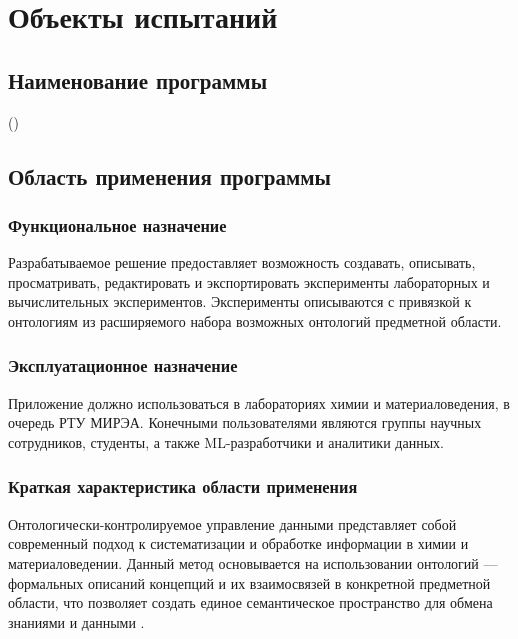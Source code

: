 \documentclass[a4paper,12pt,reqno]{article}
\begin{document}
    \project{\unskip}

    \firstPage
    \newpage
    \secondPage
    \newpage
    \thirdPage
    \newpage

    \section{Объекты испытаний}

    \subsection{Наименование программы}
     (\unskip)

    \subsection{Область применения программы}

    \subsubsection{Функциональное назначение}
    Разрабатываемое решение предоставляет возможность создавать, описывать, просматривать, редактировать и экспортировать эксперименты лабораторных и вычислительных экспериментов. Эксперименты описываются с привязкой к онтологиям из расширяемого набора возможных онтологий предметной области.

    \subsubsection{Эксплуатационное назначение}
    Приложение должно использоваться в лабораториях химии и материаловедения, в очередь РТУ МИРЭА. Конечными пользователями являются группы научных сотрудников, студенты, а также ML-разработчики и аналитики данных.

    \subsubsection{Краткая характеристика области применения}
    Онтологически-контролируемое управление данными представляет собой современный подход к систематизации и обработке информации в химии и материаловедении. Данный метод основывается на использовании онтологий — формальных описаний концепций и их взаимосвязей в конкретной предметной области, что позволяет создать единое семантическое пространство для обмена знаниями и данными \cite{ontology:base}.
\end{document}
